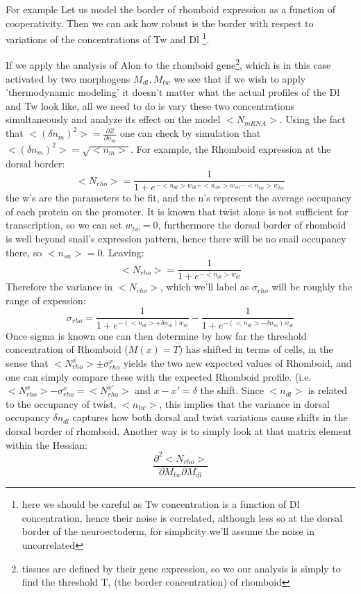 For example Let us model the  border of rhomboid expression as a function of cooperativity.  Then we can ask how robust is the border with respect to variations of the concentrations of Tw and Dl \footnote[2]{here we should be careful as Tw concentration is a function of Dl concentration, hence their noise is correlated, although less so at the dorsal border of the neuroectoderm, for simplicity we'll assume the noise in uncorrelated}.

If we apply the analysis of Alon to the rhomboid gene\footnote[3]{tissues are defined by their gene expression, so we our analysis is simply to find the threshold T, (the border concentration) of rhomboid}, which is in this case activated by two morphogens $M_{dl}, M_{tw}$ we see that if we wish to apply 'thermodynamic modeling' it doesn't matter what the actual profiles of the Dl and Tw look like, all we need to do is vary these two concentrations simultaneously and analyze its effect on the model $<N_{mRNA}>$.  Using the fact that $ < ( \delta n_m )^2 > = \frac{\partial Z}{\partial n_m }$ one can check by simulation that $ < ( \delta n_m )^2 >= \sqrt{<n_m>} $.  
For example, the Rhomboid expression at the dorsal border:
\begin{equation}\label{}
    <N_{rho} > = \frac{1}{1+e^{-<n_{dl}>w_{dl} + <n_{sn}>w_{sn} -<n_{tw}>w_{tw}}}
\end{equation}
the w's are the parameters to be fit, and the n's represent the average occupancy of each protein on the promoter.
It is known that twist alone is not sufficient for transcription, so we can set $w_{tw} = 0$, furthermore the dorsal border of rhomboid is well beyond snail's expression pattern, hence there will be no snail occupancy there, so $<n_{sn}>=0$.  Leaving:
\begin{equation}\label{}
    <N_{rho} > = \frac{1}{1+e^{-<n_{dl}>w_{dl} }}
\end{equation}
Therefore the variance in $<N_{rho} >$, which we'll label as $\sigma_{rho}$ will be roughly the range of expession:
\begin{equation}\label{}
 \sigma_{rho}  = \frac{1}{1+e^{-(<n_{dl}> +\delta n_m ) w_{dl} }} - \frac{1}{1+e^{-(<n_{dl}> -\delta n_m ) w_{dl} }}
\end{equation}
Once sigma is known one can then determine by how far the threshold concentration of Rhomboid ($M(x) = T $) has shifted in terms of cells, in the sense that $<N_{rho}^x > \pm \sigma_{rho}^x$ yields the two new expected values of Rhomboid, and one can simply compare these with the expected Rhomboid profile. (i.e.  $ <N_{rho}^x >- \sigma_{rho}^x  = <N_{rho}^{x'} >$  and $x-x' = \delta$ the shift.  Since $<n_{dl}>$ is related to the occupancy of twist, $<n_{tw}>$, this implies that the variance in dorsal occupancy $\delta n_{dl}$ captures how both dorsal and twist variations cause shifts in the dorsal border of rhomboid.  Another way is to simply look at that matrix element within the Hessian:
\begin{equation}\label{}
    \frac{\partial^2 <N_{rho}>}{\partial M_{tw} \partial M_{dl}}
\end{equation}
